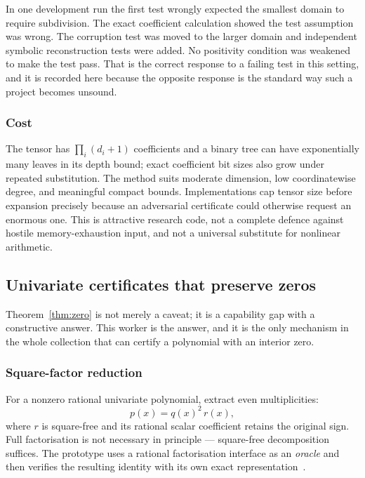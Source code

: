 \begin{remark}
In one development run the first test wrongly expected the smallest domain to
require subdivision. The exact coefficient calculation showed the test
assumption was wrong. The corruption test was moved to the larger domain and
independent symbolic reconstruction tests were added. No positivity condition
was weakened to make the test pass. That is the correct response to a failing
test in this setting, and it is recorded here because the opposite response is
the standard way such a project becomes unsound.
\end{remark}

\subsubsection*{Cost}

The tensor has $\prod_i(d_i+1)$ coefficients and a binary tree can have
exponentially many leaves in its depth bound; exact coefficient bit sizes also
grow under repeated substitution. The method suits moderate dimension, low
coordinatewise degree, and meaningful compact bounds. Implementations cap tensor
size before expansion precisely because an adversarial certificate could
otherwise request an enormous one. This is attractive research code, not a
complete defence against hostile memory-exhaustion input, and not a universal
substitute for nonlinear arithmetic.

\subsection{Univariate certificates that preserve zeros}
\label{sec:sturm}

Theorem~\ref{thm:zero} is not merely a caveat; it is a capability gap with a
constructive answer. This worker is the answer, and it is the only mechanism in
the whole collection that can certify a polynomial with an interior zero.

\subsubsection*{Square-factor reduction}

For a nonzero rational univariate polynomial, extract even multiplicities:
\[
  p(x)=q(x)^2\,r(x),
\]
where $r$ is square-free and its rational scalar coefficient retains the
original sign. Full factorisation is not necessary in principle --- square-free
decomposition suffices. The prototype uses a rational factorisation interface as
an \emph{oracle} and then verifies the resulting identity with its own exact
representation~\cite{sympy-polys}.


